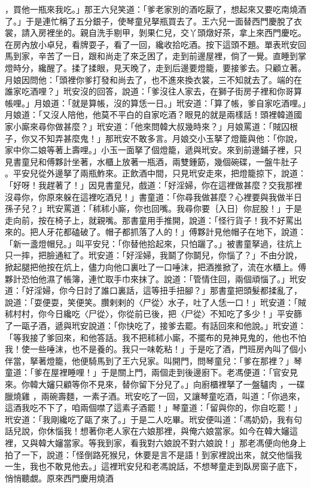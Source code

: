 \begin{showcontents}{}
，買他一瓶來我吃。」那王六兒笑道：「爹老家別的酒吃厭了，想起來又要吃南燒酒了。」于是連忙稱了五分銀子，使琴童兒拏瓶買去了。王六兒一面替西門慶脫了衣裳，請入房裡坐的。親自洗手剔甲，剝果仁兒，交丫頭燉好茶，拿上來西門慶吃。在房內放小卓兒，看牌耍子，看了一回，纔收拾吃酒。按下這頭不題。單表玳安回馬到家，辛苦了一日，跟和尚走了來乏困了，走到前邊屋裡，倘了一覺。直睡到掌燈時分，纔醒了。揉了揉眼，見天晚了，走到后邊要燈籠，要接爹去。只顧立著。月娘因問他：「頭裡你爹打發和尚去了，也不進來換衣裳，三不知就去了。端的在誰家吃酒哩？」玳安沒的回答，說道：「爹沒往人家去，在獅子街房子裡和你哥算帳哩。」月娘道：「就是算帳，沒的算恁一日。」玳安道：「算了帳，爹自家吃酒哩。」月娘道：「又沒人陪他，他莫不平白的自家吃酒？眼見的就是兩樣話！頭裡韓道國家小廝來尋你做甚麼？」玳安道：「他來問韓大叔幾時來？」月娘罵道：「賊囚根子，你又不知弄甚麼鬼！」那玳安不敢多言。月娘交小玉拏了燈籠與他：「你說，家中你二娘等著上壽哩。」小玉一面拏了個燈籠，遞與玳安。來到前邊鋪子裡，只見書童兒和傅夥計坐著，水櫃上放著一瓶酒，兩雙鍾筯，幾個碗碟，一盤牛肚子 。平安兒從外邊拏了兩瓶鮓來。正飲酒中間，只見玳安走來，把燈籠掠下，說道：「好呀！我趕著了！」因見書童兒，戲道：「好淫婦，你在這裡做甚麼？交我那裡沒尋你，你原來躲在這裡吃酒兒！」書童道：「你尋我做甚麼？心裡要與我做半日孫子兒？」玳安罵道：「秫秫小廝，你也回嘴。我尋你要｛入日｝你屁股！」于是走向前，按在椅子上，就親嘴。那書童用手推開，說道：「怪行貨子！我不好罵出來的。把人牙花都磕破了。帽子都抓落了人的！」傅夥計見他帽子在地下，說道：「新一盞燈帽兒。」叫平安兒：「你替他拾起來，只怕躧了。」被書童拏過，往炕上只一摔，把臉通紅了。玳安道：「好淫婦，我鬬了你鬬兒，你惱了？」不由分說，掀起腿把他按在炕上，儘力向他口裏吐了一口唾沫，把酒推掀了，流在水櫃上。傅夥計恐怕他濕了帳簿，連忙取手巾來抹了。說道：「管情住回，兩個頑惱了。」玳安道：「好淫婦，你今日討了誰口裏話，這等扭手扭腳？」那書童把頭髮都揉亂了，說道：「耍便耍，笑便笑。臢剌剌的〈尸從〉水子，吐了人恁一口！」玳安道：「賊秫村村，你今日纔吃〈尸從〉，你從前已後，把〈尸從〉不知吃了多少！」平安篩了一甌子酒，遞與玳安說道：「你快吃了，接爹去罷。有話回來和他說。」玳安道：「等我接了爹回來，和他答話。我不把秫秫小廝，不擺布的見神見鬼的，他也不怕我！使一些唾沫，也不是養的。我只一味乾粘！」于是吃了酒，門班房內叫了個小伴當，拏著燈籠，他便騎馬到了王六兒家。叫開門，問琴童兒：「爹在那裡？」琴童道：「爹在屋裡睡哩！」于是關上門，兩個走到後邊廚下。老馮便道：「官安見來。你韓大嬸只顧等你不見來，替你留下分兒了。」向廚櫃裡拏了一盤驢肉 ，一碟臘燒雞 ，兩碗壽麵，一素子酒。玳安吃了一回，又讓琴童吃酒，叫道：「你過來，這酒我吃不下了，咱兩個噤了這素子酒罷！」琴童道：「留與你的，你自吃罷！」玳安道：「我剛纔吃了甌了來了。」于是二人吃畢。玳安便叫道：「馮奶奶，我有句話兒說，你休惱我！想著你老人家在六娘那裡，與俺六娘當家。如今在韓大嬸這裡，又與韓大嬸當家。等我到家，看我對六娘說不對六娘說！」那老馮便向他身上拍了一下，說道：「怪倒路死猴兒，休要是言不是語！到家裡說出來，就交他惱我一生，我也不敢見他去。」這裡玳安兒和老馮說話，不想琴童走到臥房窗子底下，悄悄聽覷。原來西門慶用燒酒 
\end{showcontents}

